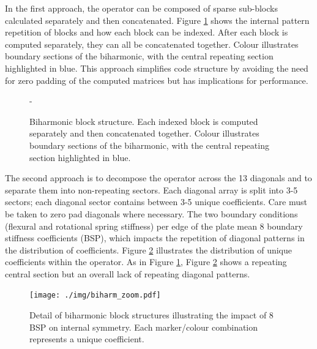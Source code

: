 In the first approach, the operator can be composed of sparse sub-blocks calculated separately and then concatenated. Figure \ref{fig:bh-block} shows the internal pattern repetition of blocks and how each block can be indexed. After each block is computed separately, they can all be concatenated together. Colour illustrates boundary sections of the biharmonic, with the central repeating section highlighted in blue. This approach simplifies code structure by avoiding the need for zero padding of the computed matrices but has implications for performance.  
\begin{figure}[H]%
  \centering
  \qquad
-  \caption{Biharmonic block structure. Each indexed block is computed separately and then concatenated together. Colour illustrates boundary sections of the biharmonic, with the central repeating section highlighted in blue. }%
  \label{fig:bh-block}%
\end{figure}
The second approach is to decompose the operator across the 13 diagonals and to separate them into non-repeating sectors. Each diagonal array is split into 3-5 sectors; each diagonal sector contains between 3-5 unique coefficients. Care must be taken to zero pad diagonals where necessary. The two boundary conditions (flexural and rotational spring stiffness) per edge of the plate mean 8 boundary stiffness coefficients (BSP), which impacts the repetition of diagonal patterns in the distribution of coefficients. Figure \ref{fig:biharm_zoom} illustrates the distribution of unique coefficients within the operator. As in Figure \ref{fig:bh-block}, Figure \ref{fig:biharm_zoom} shows a repeating central section but an overall lack of repeating diagonal patterns. 
\begin{figure}[H]
    \raggedleft
    \texttt{[image: ./img/biharm\_zoom.pdf]}
    \caption{Detail of biharmonic block structures illustrating the impact of 8 BSP on internal symmetry.  Each marker/colour combination represents a unique coefficient.}
    \label{fig:biharm_zoom}
\end{figure}
